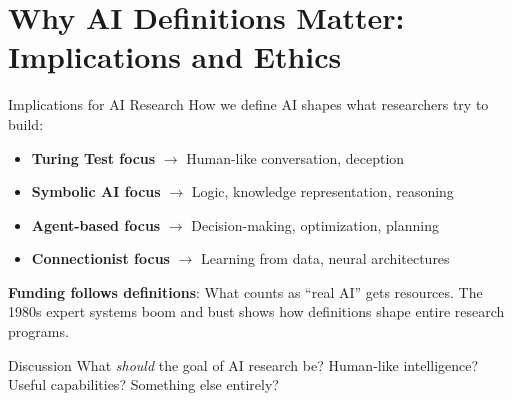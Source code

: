 \documentclass[aspectratio=169,11pt]{beamer}
\begin{document}
\section{Why AI Definitions Matter: Implications and Ethics}

\begin{frame}{Implications for AI Research}
How we define AI shapes what researchers try to build:

\vspace{0.2em}
\begin{itemize}
    \item \textbf{Turing Test focus} $\rightarrow$ Human-like conversation, deception
    \item \textbf{Symbolic AI focus} $\rightarrow$ Logic, knowledge representation, reasoning
    \item \textbf{Agent-based focus} $\rightarrow$ Decision-making, optimization, planning
    \item \textbf{Connectionist focus} $\rightarrow$ Learning from data, neural architectures
\end{itemize}

\vspace{0.3em}
\textbf{Funding follows definitions}: What counts as ``real AI'' gets resources. The 1980s expert systems boom and bust shows how definitions shape entire research programs.

\vspace{0.3em}
\begin{alertblock}{Discussion}
What \emph{should} the goal of AI research be? Human-like intelligence? Useful capabilities? Something else entirely?
\end{alertblock}
\end{frame}
\end{document}
